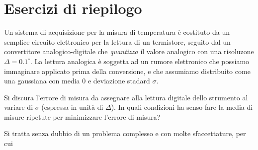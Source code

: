 \chapter{Esercizi di riepilogo}


\begin{exercise}

Un sistema di acquisizione per la misura di temperatura \`e costituto da un semplice
circuito elettronico per la lettura di un termistore, seguito dal un convertitore
analogico-digitale che \emph{quantizza} il valore analogico con una risoluzone
$\Delta = 0.1^\circ$. La lettura analogica \`e soggetta ad un rumore elettronico che
possiamo immaginare applicato prima della conversione, e che assumiamo distribuito come
una gaussiana con media $0$ e deviazione stadard $\sigma$.

Si discura l'errore di misura da assegnare alla lettura digitale dello strumento
al variare di $\sigma$ (espressa in unit\`a di $\Delta$). In quali condizioni
ha senso fare la media di misure ripetute per minimizzare l'errore di misura?

\end{exercise}


\begin{solution}

Si tratta senza dubbio di un problema complesso e con molte sfaccettature, per cui

\end{solution}